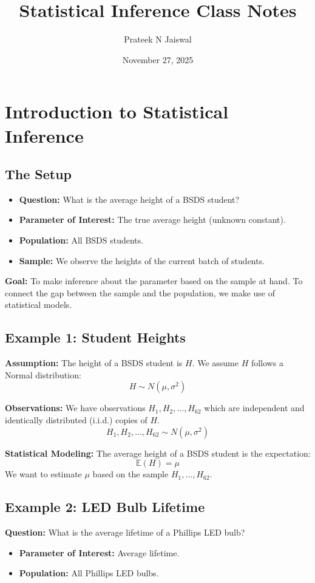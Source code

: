 \documentclass[12pt, a4paper]{article}
\title{\textbf{Statistical Inference Class Notes}}
\author{Prateek N Jaiswal}
\date{November 27, 2025}
\theoremstyle{definition}
\newcommand{\E}{\mathbb{E}}
\begin{document}
\maketitle
\tableofcontents
\newpage

\section{Introduction to Statistical Inference}

\subsection*{The Setup}
\begin{itemize}
    \item \textbf{Question:} What is the average height of a BSDS student?
    \item \textbf{Parameter of Interest:} The true average height (unknown constant).
    \item \textbf{Population:} All BSDS students.
    \item \textbf{Sample:} We observe the heights of the current batch of students.
\end{itemize}

\textbf{Goal:} To make inference about the parameter based on the sample at hand. To connect the gap between the sample and the population, we make use of statistical models.

\subsection*{Example 1: Student Heights}
\textbf{Assumption:}
The height of a BSDS student is $H$. We assume $H$ follows a Normal distribution:
$$ H \sim N(\mu, \sigma^2) $$

\textbf{Observations:}
We have observations $H_1, H_2, \dots, H_{62}$ which are independent and identically distributed (i.i.d.) copies of $H$.
$$ H_1, H_2, \dots, H_{62} \sim N(\mu, \sigma^2) $$

\textbf{Statistical Modeling:}
The average height of a BSDS student is the expectation:
$$ \E(H) = \mu $$
We want to estimate $\mu$ based on the sample $H_1, \dots, H_{62}$.

\subsection*{Example 2: LED Bulb Lifetime}
\textbf{Question:} What is the average lifetime of a Phillips LED bulb?
\begin{itemize}
    \item \textbf{Parameter of Interest:} Average lifetime.
    \item \textbf{Population:} All Phillips LED bulbs.
\end{itemize}
\end{document}
